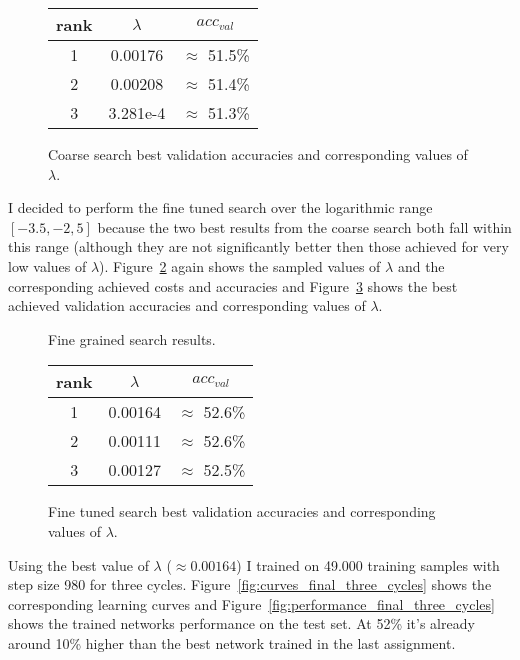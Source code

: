 \documentclass{article}
\begin{document}
\begin{figure}[H]
  \centering
    \footnotesize
    \begin{tabular}{|c|c|c|}
    \hline
    rank   & $\lambda$  & $acc_{val}$      \\
    \hline
    1      & 0.00176    & $\approx$ 51.5\% \\
    \hline
    2      & 0.00208    & $\approx$ 51.4\% \\
    \hline
    3      & 3.281e-4   & $\approx$ 51.3\% \\
    \hline
    \end{tabular}
  \caption{Coarse search best validation accuracies and corresponding values of
           $\lambda$.}
  \label{fig:search_coarse_best}
\end{figure}

\noindent
I decided to perform the fine tuned search over the logarithmic range $[-3.5,
-2,5]$ because the two best results from the coarse search both fall within
this range (although they are not significantly better then those achieved for
very low values of $\lambda$). Figure~\ref{fig:search_fine} again shows the
sampled values of $\lambda$ and the corresponding achieved costs and accuracies
and Figure~\ref{fig:search_fine_best} shows the best achieved validation
accuracies and corresponding values of $\lambda$.

\begin{figure}[H]
  \centering
    
  \caption{Fine grained search results.}
  \label{fig:search_fine}
\end{figure}

\begin{figure}[H]
  \centering
    \footnotesize
    \begin{tabular}{|c|c|c|}
    \hline
    rank   & $\lambda$  & $acc_{val}$      \\
    \hline
    1      & 0.00164    & $\approx$ 52.6\% \\
    \hline
    2      & 0.00111    & $\approx$ 52.6\% \\
    \hline
    3      & 0.00127    & $\approx$ 52.5\% \\
    \hline
    \end{tabular}
  \caption{Fine tuned search best validation accuracies and corresponding values
           of $\lambda$.}
  \label{fig:search_fine_best}
\end{figure}

\noindent
Using the best value of $\lambda$ ($\approx 0.00164$) I trained on 49.000
training samples with step size 980 for three cycles.
Figure~\ref{fig:curves_final_three_cycles} shows the corresponding learning
curves and Figure~\ref{fig:performance_final_three_cycles} shows the trained
networks performance on the test set. At 52\% it's already around 10\% higher
than the best network trained in the last assignment.
\end{document}
